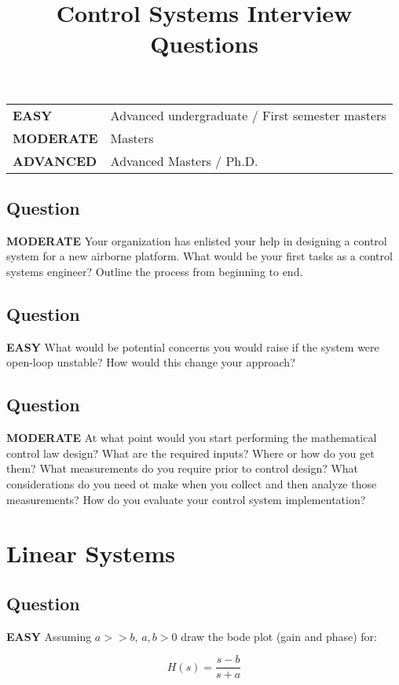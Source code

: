 \documentclass{article}
\newcommand{\RatingBase}[2]{\textcolor{#1}{{\fontfamily{phv}\selectfont\textbf{#2}}}}
\newcommand{\Easy}{\RatingBase{green!50!black!50}{EASY}}
\newcommand{\Moderate}{\RatingBase{yellow!50!black!50}{MODERATE}}
\newcommand{\Advanced}{\RatingBase{red!50!black!50}{ADVANCED}}
\begin{document}
\title{Control Systems Interview Questions}
\maketitle

\begin{tabular}{ll}
\Easy{} &Advanced undergraduate / First semester masters\\
\Moderate{} &Masters\\
\Advanced{} & Advanced Masters / Ph.D.\\
\end{tabular}
\subsection{Question} \Moderate{}
Your organization has enlisted your help in designing a control system for a new airborne platform.  What would be your first tasks as a control systems engineer?  Outline the process from beginning to end.

\subsection{Question} \Easy{}
What would be potential concerns you would raise if the system were open-loop unstable?  How would this change your approach?

\subsection{Question} \Moderate{}
At what point would you start performing the mathematical control law design?  What are the required inputs?  Where or how do you get them?  What measurements do you require prior to control design?  What considerations do you need ot make when you collect and then analyze those measurements?  How do you evaluate your control system implementation?

\section{Linear Systems}
\subsection{Question} \Easy{}
Assuming $a >> b $, $a,b > 0$ draw the bode plot (gain and phase) for:

\begin{equation}
H(s) = \frac{s-b}{s+a}
\end{equation}
\end{document}

